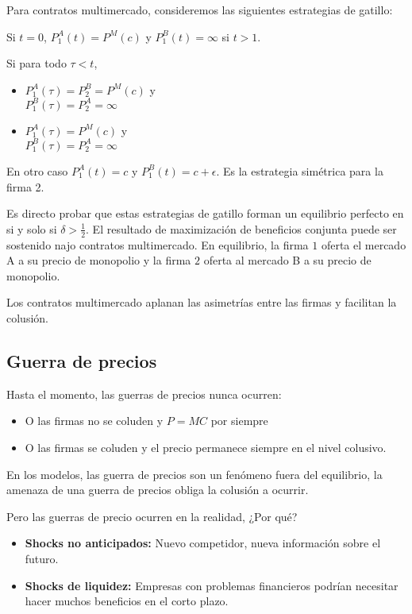 \documentclass[letterpaper,12pt,twocolumn]{report}
\begin{document}
Para contratos multimercado, consideremos las siguientes estrategias de gatillo:

Si $t=0$, $P_1^A(t)=P^M(c)$ y $P_1^B(t)= \infty$ si $t>1$. 

Si para todo $\tau <t$, 

\begin{itemize}
	\item $P_1^A(\tau)=P_2^B= P^M(c)$ y \\ $P_1^B(\tau)=P_2^A= \infty$
	\item $P_1^A(\tau)= P^M(c)$ y \\ $P_1^B(\tau)=P_2^A= \infty$
\end{itemize}

En otro caso $P_1^A(t)=c$ y $P_1^B(t)= c + \epsilon$. Es la estrategia simétrica para la firma 2.

Es directo probar que estas estrategias de gatillo forman un equilibrio perfecto en si y solo si $\delta>\frac{1}{2}$. El resultado de maximización de beneficios conjunta puede ser sostenido najo contratos multimercado. En equilibrio, la firma $1$ oferta el mercado A a su precio de monopolio y la firma $2$ oferta al mercado B a su precio de monopolio.

Los contratos multimercado aplanan las asimetrías entre las firmas y facilitan la colusión.

\subsection*{Guerra de precios}

Hasta el momento, las guerras de precios nunca ocurren:

\begin{itemize}
	\item O las firmas no se coluden y $P=MC$ por siempre
	\item O las firmas se coluden y el precio permanece siempre en el nivel colusivo.
\end{itemize}

En los modelos, las guerra de precios son un fenómeno fuera del equilibrio, la amenaza de una guerra de precios obliga la colusión a ocurrir.

Pero las guerras de precio ocurren en la realidad, ¿Por qué?

\begin{itemize}
	\item \textbf{Shocks no anticipados:} Nuevo competidor, nueva información sobre el futuro.
	\item \textbf{Shocks de liquidez:} Empresas con problemas financieros podrían necesitar hacer muchos beneficios en el corto plazo.
\end{itemize}
\end{document}
